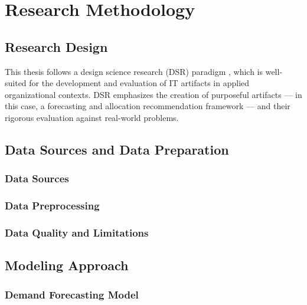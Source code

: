 \chapter{Research Methodology}
\label{chap:methodology}

\section{Research Design}
\label{sec:research_design}

This thesis follows a design science research (DSR) paradigm \citep{hevner2004design}, which is well-suited for the development and evaluation of IT artifacts in applied organizational contexts. DSR emphasizes the creation of purposeful artifacts — in this case, a forecasting and allocation recommendation framework — and their rigorous evaluation against real-world problems.


\section{Data Sources and Data Preparation}
\label{sec:data}

\subsection{Data Sources}

\subsection{Data Preprocessing}

\subsection{Data Quality and Limitations}

\section{Modeling Approach}
\label{sec:modeling}

\subsection{Demand Forecasting Model}

